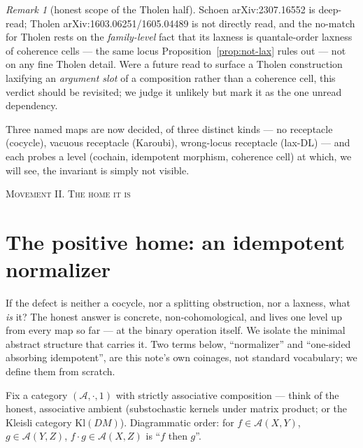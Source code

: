 \documentclass[11pt]{amsart}
\theoremstyle{plain}
\theoremstyle{definition}
\theoremstyle{remark}
\newtheorem{remark}[theorem]{Remark}
\newcommand{\Kl}{\mathrm{Kl}}
\begin{document}
\begin{remark}[honest scope of the Tholen half]
Schoen arXiv:2307.16552 is deep-read; Tholen arXiv:1603.06251/1605.04489 is not directly read, and
the no-match for Tholen rests on the \emph{family-level} fact that its laxness is quantale-order
laxness of coherence cells --- the same locus Proposition~\ref{prop:not-lax} rules out --- not on any
fine Tholen detail. Were a future read to surface a Tholen construction laxifying an \emph{argument
slot} of a composition rather than a coherence cell, this verdict should be revisited; we judge it
unlikely but mark it as the one unread dependency.
\end{remark}

Three named maps are now decided, of three distinct kinds --- no receptacle (cocycle), vacuous
receptacle (Karoubi), wrong-locus receptacle (lax-DL) --- and each probes a level (cochain,
idempotent morphism, coherence cell) at which, we will see, the invariant is simply not visible.

\bigskip
\begin{center}\textsc{Movement II. The home it is}\end{center}

\section{The positive home: an idempotent normalizer}
\label{sec:home}

If the defect is neither a cocycle, nor a splitting obstruction, nor a laxness, what \emph{is} it?
The honest answer is concrete, non-cohomological, and lives one level up from every map so far ---
at the binary operation itself. We isolate the minimal abstract structure that carries it. Two terms
below, ``normalizer'' and ``one-sided absorbing idempotent'', are this note's own coinages, not
standard vocabulary; we define them from scratch.

Fix a category $(\mathcal{A},\cdot,1)$ with strictly associative composition --- think of the
honest, associative ambient (substochastic kernels under matrix product; or the Kleisli category
$\Kl(DM)$). Diagrammatic order: for $f\in\mathcal{A}(X,Y)$, $g\in\mathcal{A}(Y,Z)$, $f\cdot g\in
\mathcal{A}(X,Z)$ is ``$f$ then $g$''.
\end{document}
